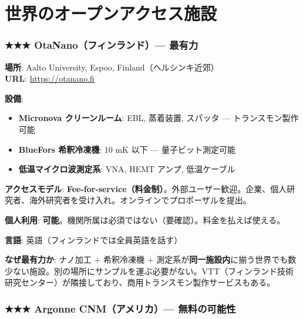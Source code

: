 \documentclass[12pt,a4paper]{article}
\begin{document}
\part{世界のオープンアクセス施設}

\section{★★★ OtaNano（フィンランド）— 最有力}

\begin{facbox}
\textbf{場所}: Aalto University, Espoo, Finland（ヘルシンキ近郊）\\
\textbf{URL}: \url{https://otanano.fi}

\textbf{設備}:
\begin{itemize}
\item \textbf{Micronova クリーンルーム}: EBL, 蒸着装置, スパッタ — トランスモン製作可能
\item \textbf{BlueFors 希釈冷凍機}: 10 mK 以下 — 量子ビット測定可能
\item \textbf{低温マイクロ波測定系}: VNA, HEMT アンプ, 低温ケーブル
\end{itemize}

\textbf{アクセスモデル}: \textbf{Fee-for-service（料金制）}。外部ユーザー歓迎。企業、個人研究者、海外研究者を受け入れ。オンラインでプロポーザルを提出。

\textbf{個人利用}: \textbf{可能}。機関所属は必須ではない（要確認）。料金を払えば使える。

\textbf{言語}: 英語（フィンランドでは全員英語を話す）

\textbf{なぜ最有力か}: ナノ加工 + 希釈冷凍機 + 測定系が\textbf{同一施設内}に揃う世界でも数少ない施設。別の場所にサンプルを運ぶ必要がない。VTT（フィンランド技術研究センター）が隣接しており、商用トランスモン製作サービスもある。
\end{facbox}

\section{★★★ Argonne CNM（アメリカ）— 無料の可能性}
\end{document}

